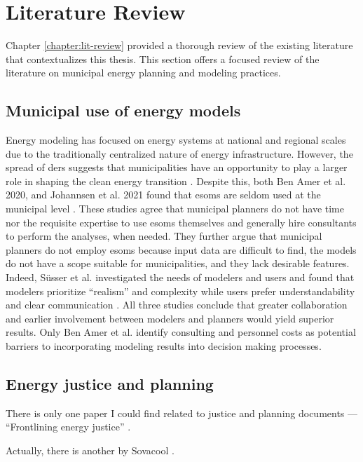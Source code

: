 \section{Literature Review}
Chapter \ref{chapter:lit-review} provided a thorough review of the existing
literature that contextualizes this thesis. This section offers a focused review
of the literature on municipal energy planning and modeling practices.

\subsection{Municipal use of energy models}

Energy modeling has focused on energy systems at national and regional scales
due to the traditionally centralized nature of energy infrastructure. However,
the spread of \acp{der} suggests that municipalities have an opportunity to play
a larger role in shaping the clean energy transition
\cite{shen_facilitating_2021}. Despite this, both Ben Amer et al. 2020, and
Johannsen et al. 2021 found that \acp{esom} are seldom used at the municipal
level \cite{ben_amer_too_2020,johannsen_designing_2021}. These studies agree
that municipal planners do not have time nor the requisite expertise to use
\acp{esom} themselves and generally hire consultants to perform the analyses,
when needed. They further argue that municipal planners do not employ \acp{esom}
because input data are difficult to find, the models do not have a scope
suitable for municipalities, and they lack desirable features. Indeed,
S\"{u}sser et al. investigated the needs of modelers and users and found that
modelers prioritize ``realism'' and complexity while users prefer
understandability and clear communication \cite{susser_better_2022}. All three
studies conclude that greater collaboration and earlier involvement between
modelers and planners would yield superior results. Only Ben Amer et al.
identify consulting and personnel costs as potential barriers to incorporating
modeling results into decision making processes.

\subsection{Energy justice and planning}
There is only one paper I could find related to justice and planning documents
--- ``Frontlining energy justice'' \cite{elmallah_frontlining_2022}.

Actually, there is another by Sovacool \cite{sovacool_imagining_2020}.

